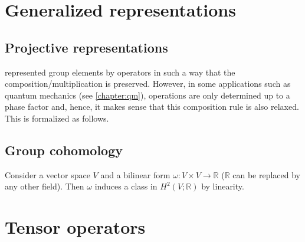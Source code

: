 \section{Generalized representations}
\subsection{Projective representations}\label{section:projective_representation}

     represented group elements by operators in such a way that the composition/multiplication is preserved. However, in some applications such as quantum mechanics (see \cref{chapter:qm}), operations are only determined up to a phase factor and, hence, it makes sense that this composition rule is also relaxed. This is formalized as follows.


\subsection{Group cohomology}

    \begin{example}
        Consider a vector space $V$ and a bilinear form $\omega:V\times V\rightarrow\mathbb{R}$ ($\mathbb{R}$ can be replaced by any other field). Then $\omega$ induces a class in $H^2(V;\mathbb{R})$ by linearity.
    \end{example}


\section{Tensor operators}

